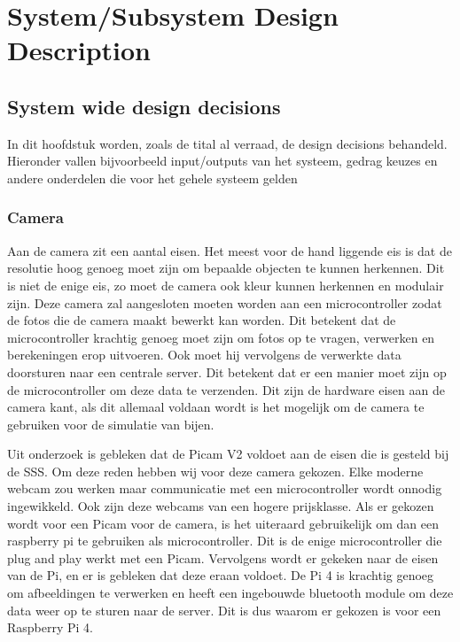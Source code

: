 \section{System/Subsystem Design Description}

\subsection{System wide design decisions}
In dit hoofdstuk worden, zoals de tital al verraad, de design decisions behandeld. Hieronder vallen bijvoorbeeld 
input/outputs van het systeem, gedrag keuzes en andere onderdelen die voor het gehele systeem gelden


\subsubsection{Camera}
Aan de camera zit een aantal eisen. Het meest voor de hand liggende eis is dat de resolutie hoog genoeg moet zijn
om bepaalde objecten te kunnen herkennen. Dit is niet de enige eis, zo moet de camera ook kleur kunnen herkennen 
en modulair zijn. Deze camera zal aangesloten moeten worden aan een microcontroller 
zodat de fotos die de camera maakt bewerkt kan worden. Dit betekent dat de microcontroller krachtig genoeg moet zijn 
om fotos op te vragen, verwerken en berekeningen erop uitvoeren. Ook moet hij vervolgens de verwerkte data doorsturen 
naar een centrale server. Dit betekent dat er een manier moet zijn op de microcontroller om deze data te verzenden.
Dit zijn de hardware eisen aan de camera kant, als dit allemaal voldaan wordt is het mogelijk om de camera te 
gebruiken voor de simulatie van bijen.

Uit onderzoek is gebleken dat de Picam V2 voldoet aan de eisen die is gesteld bij de SSS. 
Om deze reden hebben wij voor deze camera gekozen. Elke moderne webcam zou werken maar communicatie met een 
microcontroller wordt onnodig ingewikkeld. Ook zijn deze webcams van een hogere prijsklasse.
Als er gekozen wordt voor een Picam voor de camera, is het uiteraard gebruikelijk om dan een raspberry pi 
te gebruiken als microcontroller. Dit is de enige microcontroller die plug and play werkt met een Picam. 
Vervolgens wordt er gekeken naar de eisen van de Pi, en er is gebleken dat deze eraan voldoet. 
De Pi 4 is krachtig genoeg om afbeeldingen te verwerken en heeft een ingebouwde bluetooth module 
om deze data weer op te sturen naar de server. Dit is dus waarom er gekozen is voor een Raspberry Pi 4.


\newpage

